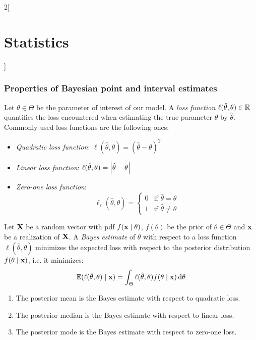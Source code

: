 \documentclass[../../../main_math.tex]{subfiles}
\begin{document}
\begin{multicols}{2}[\section{Statistics}]
  \subsubsection{Properties of Bayesian point and interval estimates}
  \begin{definition}
    Let $\theta\in\Theta$ be the parameter of interest of our model. A \emph{loss function} $\ell(\hat\theta,\theta)\in\mathbb{R}$ quantifies the loss encountered when estimating the true parameter $\theta$ by $\hat\theta$. Commonly used loss functions are the following ones:
    \begin{itemize}
      \item \emph{Quadratic loss function}: $\ell(\hat\theta,\theta)={(\hat\theta-\theta)}^2$
      \item \emph{Linear loss function}: $\ell(\hat\theta,\theta)=\abs{\hat\theta-\theta}$
      \item \emph{Zero-one loss function}: $$\ell_\varepsilon(\hat\theta,\theta)=
              \begin{cases}
                0 & \text{if }\hat\theta=\theta   \\
                1 & \text{if }\hat\theta\ne\theta
              \end{cases}$$
    \end{itemize}
  \end{definition}
  \begin{definition}
    Let $\boldsymbol{\mathrm{X}}$ be a random vector with pdf $f(\boldsymbol{\mathrm{x}}\mid \theta)$, $f(\theta)$ be the prior of $\theta\in\Theta$ and $\boldsymbol{\mathrm{x}}$ be a realization of $\boldsymbol{\mathrm{X}}$. A \emph{Bayes estimate} of $\theta$ with respect to a loss function $\ell(\hat\theta,\theta)$ minimizes the expected loss with respect to the posterior distribution $f(\theta\mid\boldsymbol{\mathrm{x}})$, i.e. it minimizes: $$\mathbb{E}(\ell(\hat\theta,\theta)\mid\boldsymbol{\mathrm{x}})=\int_\Theta\ell(\hat\theta,\theta)f(\theta\mid\boldsymbol{\mathrm{x}})\dd{\theta}$$
  \end{definition}
  \begin{proposition}
    \hfill
    \begin{enumerate}
      \item The posterior mean is the Bayes estimate with respect to quadratic loss.
      \item The posterior median is the Bayes estimate with respect to linear loss.
      \item The posterior mode is the Bayes estimate with respect to zero-one loss.
    \end{enumerate}
  \end{proposition}

\end{multicols}
\end{document}
